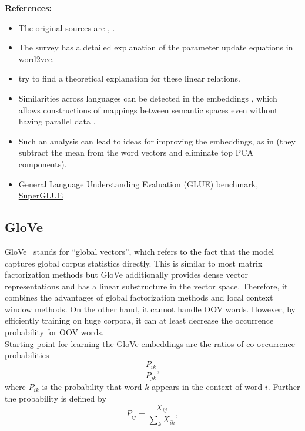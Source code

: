 \documentclass[11pt, a4paper]{amsart}
\begin{document}
\textbf{References:}
\begin{itemize}
	\item The original sources are
	\cite{DBLP:journals/corr/abs-1301-3781},
	\cite{DBLP:journals/corr/MikolovSCCD13}.
	\item The survey \cite{DBLP:journals/corr/Rong14} has a detailed explanation of the parameter update equations in word2vec.
    \item \cite{DBLP:journals/corr/abs-1901-09813} try to find a theoretical explanation for these linear relations.
    \item Similarities across languages can be detected in the embeddings \cite{DBLP:journals/corr/MikolovLS13}, which allows constructions of mappings between semantic spaces even without having parallel data \cite{DBLP:journals/corr/abs-1710-04087}.
    \item Such an analysis can lead to ideas for improving the embeddings, as in \cite{DBLP:journals/corr/MuBV17} (they subtract the mean from the word vectors and eliminate top PCA components).
    \item \href{https://gluebenchmark.com/}{General Language Understanding Evaluation (GLUE) benchmark}, \href{https://super.gluebenchmark.com/}{SuperGLUE}
\end{itemize}

\subsection{GloVe}

GloVe~\cite{pennington-etal-2014-glove} stands for ``global vectors'', which refers to the fact that the model captures global corpus statistics directly. 
This is similar to most matrix factorization methods but GloVe additionally provides dense vector representations and has a linear substructure in the vector space. 
Therefore, it combines the advantages of global factorization methods and local context window methods. 
On the other hand, it cannot handle OOV words. However, by efficiently training on huge corpora, it can at least decrease the occurrence probability for OOV words. \\

Starting point for learning the GloVe embeddings are the ratios of co-occurrence probabilities
\begin{equation}
	\frac{P_{ik}}{P_{jk}},
\end{equation}
where $P_{ik}$ is the probability that word $k$ appears in the context of word $i$. Further the probability is defined by
\begin{equation}
	P_{ij} = \frac{X_{ij}}{\sum_{k} X_{ik}},
\end{equation}
\end{document}

